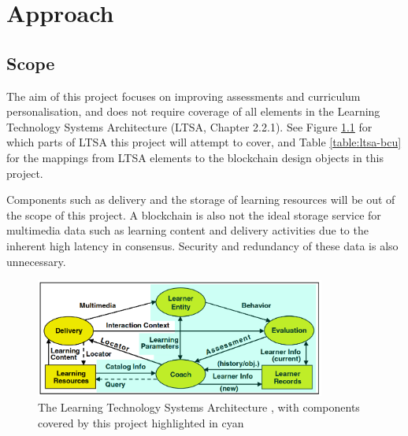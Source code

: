 \chapter{Approach}
\graphicspath{{Chapter3/Figs/Raster/}{Chapter3/Figs/}}

\section{Scope}

The aim of this project focuses on improving assessments and curriculum personalisation, and does not require 
coverage of all elements in the Learning Technology Systems Architecture (LTSA, Chapter 2.2.1). 
See Figure \ref{fig:ltsa-covered} for which parts of LTSA this project will attempt to cover, and 
Table \ref{table:ltsa-bcu} for the mappings from LTSA elements to the blockchain design objects in this project.

Components such as delivery and the storage of learning resources will be out of the scope of this project. 
A blockchain is also not the ideal storage service for multimedia data such as learning content and delivery activities 
due to the inherent high latency in consensus. Security and redundancy of these data is also unnecessary. 

\begin{figure}[!ht] 
    \centering    
    \includegraphics[width=0.85\textwidth]{ltsa-covered}
    \caption[Design Coverage of LTSA]
        {The Learning Technology Systems Architecture \citep{ieee2003ltsa}, 
        with components covered by this project highlighted in cyan} 
    \label{fig:ltsa-covered}
\end{figure}

